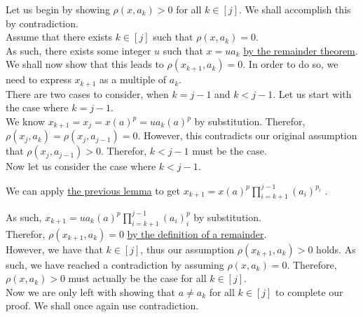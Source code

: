 \documentclass[a4paper,12pt]{article}
\begin{document}
\noindent Let us begin by showing $\rho(x, a_k) > 0$ for all $k \in [j]$. We shall accomplish this by contradiction.\\

\noindent Assume that there exists $k \in [j]$ such that $\rho(x, a_k) = 0$.\\

\noindent As such, there exists some integer $u$ such that $x = ua_k$ \hyperlink{theorem:remainder_theorem}{by the remainder theorem}.\\

\noindent We shall now show that this leads to $\rho(x_{k + 1}, a_k) = 0$. In order to do so, we need to express $x_{k + 1}$ as a multiple of $a_k$.\\

\noindent There are two cases to consider, when $k = j - 1$ and $k < j - 1$. Let us start with the case where $k = j - 1$.\\

\noindent We know $x_{k + 1} = x_j = x(a)^p = ua_k(a)^p$ by substitution. Therefor, $\rho(x_j, a_k) = \rho(x_j, a_{j - 1}) = 0$. However, this contradicts our original assumption that $\rho(x_j, a_{j - 1}) > 0$. Therefor, $k < j - 1$ must be the case.\\

\noindent Now let us consider the case where $k < j - 1$.

\noindent We can apply \hyperlink{lemma:closed_form_of_factorization}{the previous lemma} to get $\displaystyle x_{k + 1} = x(a)^p \prod_{i = k + 1}^{j - 1} (a_i)^{p_i}$ .

\noindent As such, $\displaystyle x_{k+1} = ua_k(a)^p \prod_{i = k + 1}^{j - 1} (a_i)^p_i$ by substitution.\\

\noindent Therefor,  $\rho(x_{k + 1}, a_k) = 0$ \hyperlink{theorem:remainder_function}{by the definition of a remainder}.\\ 

\noindent However, we have that $k \in [j]$, thus our assumption $\rho(x_{k + 1}, a_k) > 0$ holds. As such, we have reached a contradiction by assuming $\rho(x, a_k) = 0$. Therefore, $\rho(x, a_k) > 0$ must actually be the case for all $k \in [j]$.\\



\noindent Now we are only left with showing that $a \neq a_k$ for all $k \in [j]$ to complete our proof. We shall once again use contradiction.\\
\end{document}
